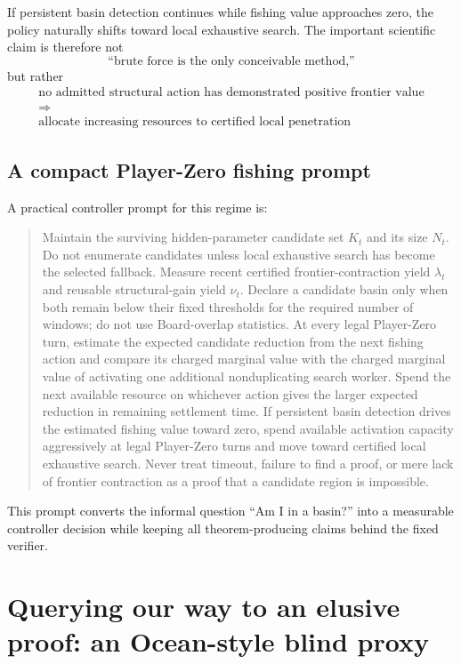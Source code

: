 \documentclass[11pt]{article}
\theoremstyle{definition}
\begin{document}
If persistent basin detection continues while fishing value approaches zero, the policy naturally shifts toward local exhaustive search. The important scientific claim is therefore not
\[
\text{``brute force is the only conceivable method,''}
\]
but rather
\[
\boxed{
\begin{gathered}
\text{no admitted structural action has demonstrated positive frontier value}\\
\Longrightarrow\\
\text{allocate increasing resources to certified local penetration}
\end{gathered}}
\]

\subsection{A compact Player-Zero fishing prompt}

A practical controller prompt for this regime is:
\begin{quote}
Maintain the surviving hidden-parameter candidate set $K_t$ and its size $N_t$. Do not enumerate candidates unless local exhaustive search has become the selected fallback. Measure recent certified frontier-contraction yield $\lambda_t$ and reusable structural-gain yield $\nu_t$. Declare a candidate basin only when both remain below their fixed thresholds for the required number of windows; do not use Board-overlap statistics. At every legal Player-Zero turn, estimate the expected candidate reduction from the next fishing action and compare its charged marginal value with the charged marginal value of activating one additional nonduplicating search worker. Spend the next available resource on whichever action gives the larger expected reduction in remaining settlement time. If persistent basin detection drives the estimated fishing value toward zero, spend available activation capacity aggressively at legal Player-Zero turns and move toward certified local exhaustive search. Never treat timeout, failure to find a proof, or mere lack of frontier contraction as a proof that a candidate region is impossible.
\end{quote}

This prompt converts the informal question ``Am I in a basin?'' into a measurable controller decision while keeping all theorem-producing claims behind the fixed verifier.


\section{Querying our way to an elusive proof: an Ocean-style blind proxy}
\end{document}
